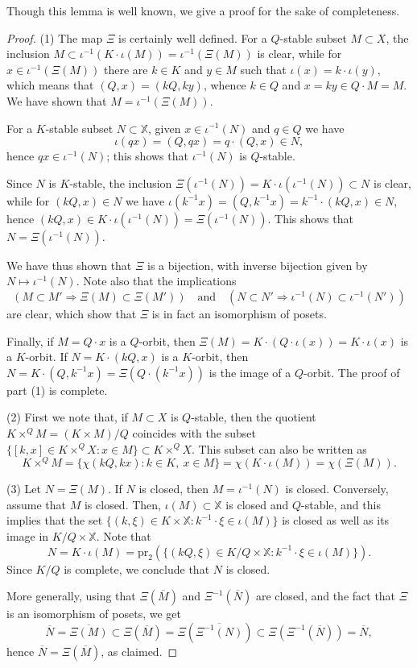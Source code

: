 \documentclass[11pt]{article}
\theoremstyle{definition}
\numberwithin{equation}{section}
\begin{document}
Though this lemma is well known, we give a proof for the sake of completeness.

\begin{proof}
(1) The map $\Xi$ is certainly well defined.
For a $Q$-stable subset $M\subset X$,
the inclusion $M\subset\iota^{-1}(K\cdot\iota(M))=\iota^{-1}(\Xi(M))$ is clear, while for $x\in\iota^{-1}(\Xi(M))$ there are $k\in K$ and $y\in M$ such that $\iota(x)=k\cdot\iota(y)$, which means that $(Q,x)=(kQ,ky)$, whence $k\in Q$ and $x=ky\in Q\cdot M=M$. We have shown that $M=\iota^{-1}(\Xi(M))$.

For a $K$-stable subset $N\subset \mathbb{X}$,
given $x\in \iota^{-1}(N)$ and $q\in Q$ we have
\[\iota(qx)=(Q,qx)=q\cdot (Q,x)\in N,\]
hence $qx\in\iota^{-1}(N)$; this shows that $\iota^{-1}(N)$ is $Q$-stable.

Since $N$ is $K$-stable, the inclusion $\Xi(\iota^{-1}(N))=K\cdot \iota(\iota^{-1}(N))\subset N$ is clear, while for $(kQ,x)\in N$ we have
$\iota(k^{-1}x)=(Q,k^{-1}x)=k^{-1}\cdot(kQ,x)\in N$, hence $(kQ,x)\in K\cdot\iota(\iota^{-1}(N))=\Xi(\iota^{-1}(N))$. This shows that $N=\Xi(\iota^{-1}(N))$.

We have thus shown that $\Xi$ is a bijection, with inverse bijection given by $N\mapsto \iota^{-1}(N)$. Note also that the implications
\[(M\subset M'\Rightarrow \Xi(M)\subset\Xi(M'))\quad\mbox{and}\quad (N\subset N'\Rightarrow \iota^{-1}(N)\subset\iota^{-1}(N'))\]
are clear, which show that $\Xi$ is in fact an isomorphism of posets.

Finally, if $M=Q\cdot x$ is a $Q$-orbit, then $\Xi(M)=K\cdot(Q\cdot\iota(x))=K\cdot \iota(x)$ is a $K$-orbit. If $N=K\cdot(kQ,x)$ is a $K$-orbit, then $N=K\cdot(Q,k^{-1}x)=\Xi(Q\cdot(k^{-1}x))$ is the image of a $Q$-orbit. The proof of part (1) is complete.



(2) First we note that, if $M\subset X$ is $Q$-stable, then the quotient $K\times^QM=(K\times M)/Q$ coincides with the subset $\{[k,x]\in K\times^QX:x\in M\}\subset K\times^QX$. This subset can also be written as
\[K\times^QM=\{\chi(kQ,kx):k\in K,\ x\in M\}=\chi(K\cdot\iota(M))=\chi(\Xi(M)).\]

(3) Let $N=\Xi(M)$. If $N$ is closed, then $M=\iota^{-1}(N)$ is closed.
Conversely, assume that $M$ is closed.
Then, $\iota(M)\subset \mathbb{X}$ is closed and $Q$-stable, and this implies that
the set $\{(k,\xi)\in K\times\mathbb{X}:k^{-1}\cdot \xi\in\iota(M)\}$ is closed as well as its image in $K/Q\times\mathbb{X}$. Note that
\[N=K\cdot \iota(M)=\mathrm{pr}_2(\{(kQ,\xi)\in K/Q\times\mathbb{X}:k^{-1}\cdot \xi\in\iota(M)\}).\]
Since $K/Q$ is complete, we conclude that $N$ is closed.




More generally, using that $\Xi(\overline{M})$ and $\Xi^{-1}(\overline{N})$ are closed, and the fact that $\Xi$ is an isomorphism of posets, we get
\[\overline{N}=\overline{\Xi(M)}\subset\Xi(\overline{M})=\Xi(\overline{\Xi^{-1}(N)})\subset\Xi(\Xi^{-1}(\overline{N}))=\overline{N},\]
hence $\overline{N}=\Xi(\overline{M})$, as claimed.\end{proof}
\end{document}

